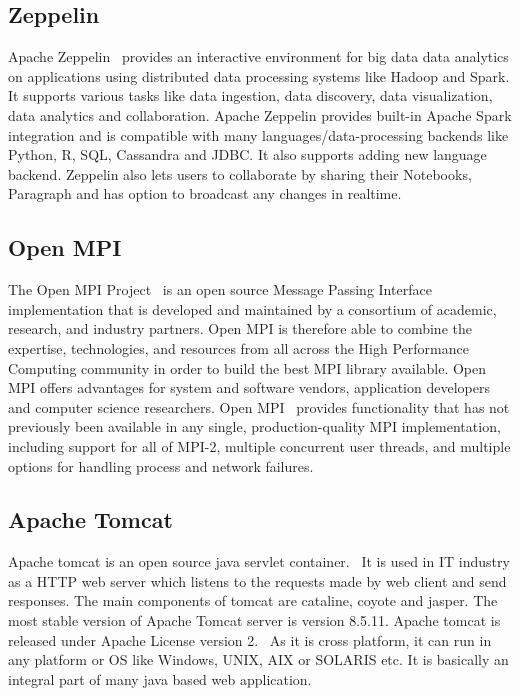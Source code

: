 \subsection{Zeppelin \cv}

Apache Zeppelin~\cite{www-zeppelinwebsite} provides an interactive
environment for big data data analytics on applications using
distributed data processing systems like Hadoop and Spark. It supports
various tasks like data ingestion, data discovery, data visualization,
data analytics and collaboration. Apache Zeppelin provides built-in
Apache Spark integration and is compatible with many
languages/data-processing backends like Python, R, SQL, Cassandra and
JDBC. It also supports adding new language backend. Zeppelin also lets
users to collaborate by sharing their Notebooks, Paragraph and has
option to broadcast any changes in realtime.

\subsection{Open MPI \cv}

The Open MPI Project~\cite{www-open-mpi} is an open source Message
Passing Interface implementation that is developed and maintained by a
consortium of academic, research, and industry partners. Open MPI is
therefore able to combine the expertise, technologies, and resources
from all across the High Performance Computing community in order to
build the best MPI library available. Open MPI offers advantages for
system and software vendors, application developers and computer
science researchers. Open MPI~\cite{open-mpi-paper-2004} provides
functionality that has not previously been available in any single,
production-quality MPI implementation, including support for all of
MPI-2, multiple concurrent user threads, and multiple options for
handling process and network failures.

\subsection{Apache Tomcat \cv}

Apache tomcat is an open source java servlet
container.~\cite{www-tomcat-official} It is used in IT industry as a
HTTP web server which listens to the requests made by web client and
send responses. The main components of tomcat are cataline, coyote and
jasper. The most stable version of Apache Tomcat server is version
8.5.11. Apache tomcat is released under Apache License version
2.~\cite{www-tomcat-wiki} As it is cross platform, it can run in any
platform or OS like Windows, UNIX, AIX or SOLARIS etc. It is basically
an integral part of many java based web application.

